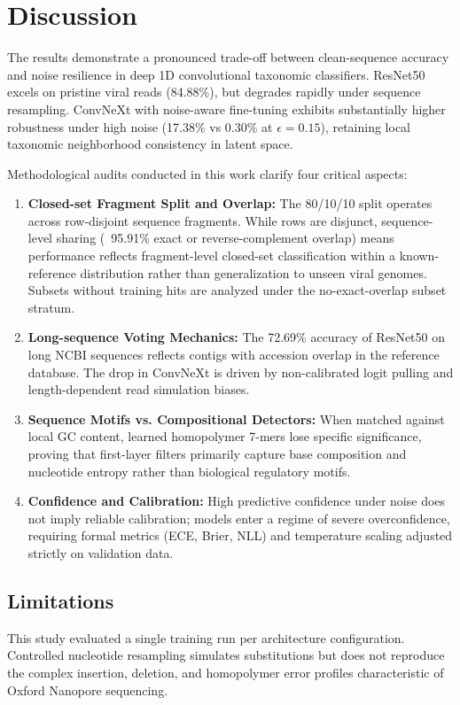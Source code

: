 \documentclass[11pt,a4paper]{article}
\begin{document}
\section{Discussion}
The results demonstrate a pronounced trade-off between clean-sequence accuracy and noise resilience in deep 1D convolutional taxonomic classifiers. ResNet50 excels on pristine viral reads (84.88\%), but degrades rapidly under sequence resampling. ConvNeXt with noise-aware fine-tuning exhibits substantially higher robustness under high noise (17.38\% vs 0.30\% at $\epsilon=0.15$), retaining local taxonomic neighborhood consistency in latent space.









Methodological audits conducted in this work clarify four critical aspects:
\begin{enumerate}
\item \textbf{Closed-set Fragment Split and Overlap:} The 80/10/10 split operates across row-disjoint sequence fragments. While rows are disjunct, sequence-level sharing (~95.91\% exact or reverse-complement overlap) means performance reflects fragment-level closed-set classification within a known-reference distribution rather than generalization to unseen viral genomes. Subsets without training hits are analyzed under the no-exact-overlap subset stratum.
\item \textbf{Long-sequence Voting Mechanics:} The 72.69\% accuracy of ResNet50 on long NCBI sequences reflects contigs with accession overlap in the reference database. The drop in ConvNeXt is driven by non-calibrated logit pulling and length-dependent read simulation biases.
\item \textbf{Sequence Motifs vs. Compositional Detectors:} When matched against local GC content, learned homopolymer 7-mers lose specific significance, proving that first-layer filters primarily capture base composition and nucleotide entropy rather than biological regulatory motifs.
\item \textbf{Confidence and Calibration:} High predictive confidence under noise does not imply reliable calibration; models enter a regime of severe overconfidence, requiring formal metrics (ECE, Brier, NLL) and temperature scaling adjusted strictly on validation data.
\end{enumerate}

\subsection{Limitations}
This study evaluated a single training run per architecture configuration. Controlled nucleotide resampling simulates substitutions but does not reproduce the complex insertion, deletion, and homopolymer error profiles characteristic of Oxford Nanopore sequencing.
\end{document}
